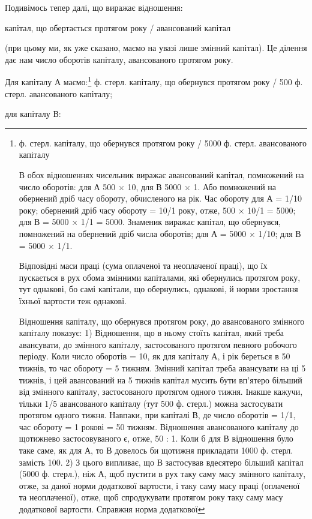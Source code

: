 Подивімось тепер далі, що виражає відношення:

капітал, що обертається протягом року / авансований капітал

(при цьому ми, як уже сказано, маємо на увазі лише змінний капітал).
Це ділення дає нам число оборотів капіталу, авансованого протягом року.

Для капіталу А маємо:\footnote{
ф. стерл. капіталу, що обернувся протягом року / 5000 ф. стерл. авансованого капіталу

В обох відношеннях чисельник виражає авансований капітал, помножений
на число оборотів: для А 500 × 10, для В 5000 × 1. Або помножений
на обернений дріб часу обороту, обчисленого на рік. Час
обороту для А = 1/10 року; обернений дріб часу обороту = 10/1 року,
отже, 500 × 10/1 = 5000; для В = 5000 × 1/1 = 5000. Знаменик виражає
капітал, що обернувся, помножений на обернений дріб числа
оборотів; для А = 5000 × 1/10; для В = 5000 × 1/1.

Відповідні маси праці (сума оплаченої та неоплаченої праці), що їх
пускається в рух обома змінними капіталами, які обернулись протягом
року, тут однакові, бо самі капітали, що обернулись, однакові, й норми
зростання їхньої вартости теж однакові.

Відношення капіталу, що обернувся протягом року, до авансованого
змінного капіталу показує: 1) Відношення, що в ньому стоїть капітал,
який треба авансувати, до змінного капіталу, застосованого протягом
певного робочого періоду. Коли число оборотів = 10, як для капіталу
А, і рік береться в 50 тижнів, то час обороту = 5 тижням. Змінний
капітал треба авансувати на ці 5 тижнів, і цей авансований на 5 тижнів
капітал мусить бути вп’ятеро більший від змінного капіталу, застосованого
протягом одного тижня. Інакше кажучи, тільки 1/5 авансованого
капіталу (тут 500 ф. стерл.) можна застосувати протягом одного тижня.
Навпаки, при капіталі В, де число оборотів = 1/1, час обороту = 1 рокові
= 50 тижням. Відношення авансованого капіталу до щотижнево застосовуваного
є, отже, 50 : 1. Коли б для В відношення було таке саме,
як для А, то В довелось би щотижня прикладати 1000 ф. стерл. замість
100. 2) З цього випливає, що В застосував вдесятеро більший
капітал (5000 ф. стерл.), ніж А, щоб пустити в рух таку саму масу змінного
капіталу, отже, за даної норми додаткової вартости, і таку саму
масу праці (оплаченої та неоплаченої), отже, щоб спродукувати протягом
року таку саму масу додаткової вартости. Справжня норма додаткової
} ф. стерл. капіталу, що обернувся протягом року / 500 ф. стерл. авансованого капіталу;

для капіталу В:
\parbreak{}  %
